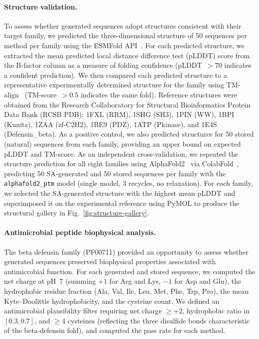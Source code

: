 \paragraph{Structure validation.}
To assess whether generated sequences adopt structures consistent with their target family, we predicted the three-dimensional structure of 50 sequences per method per family using the ESMFold API~\cite{linEvolutionaryScaleModeling2023}. For each predicted structure, we extracted the mean predicted local distance difference test (pLDDT) score from the B-factor column as a measure of folding confidence (pLDDT~$> 70$ indicates a confident prediction). We then compared each predicted structure to a representative experimentally determined structure for the family using TM-align~\cite{zhangTMalign2005} (TM-score~$> 0.5$ indicates the same fold). Reference structures were obtained from the Research Collaboratory for Structural Bioinformatics Protein Data Bank (RCSB PDB): 1FXL (RRM), 1SHG (SH3), 1PIN (WW), 1BPI (Kunitz), 1ZAA (zf-C2H2), 1BE9 (PDZ), 1ATP (Pkinase), and 1E4S (Defensin\_beta). As a positive control, we also predicted structures for 50 stored (natural) sequences from each family, providing an upper bound on expected pLDDT and TM-score. As an independent cross-validation, we repeated the structure prediction for all eight families using AlphaFold2~\cite{jumperHighlyAccurateProtein2021} via ColabFold~\cite{mirdita2022colabfold}, predicting 50 SA-generated and 50 stored sequences per family with the \texttt{alphafold2\_ptm} model (single model, 3 recycles, no relaxation). For each family, we selected the SA-generated structure with the highest mean pLDDT and superimposed it on the experimental reference using PyMOL to produce the structural gallery in Fig.~\ref{fig:structure-gallery}.

\paragraph{Antimicrobial peptide biophysical analysis.}
The beta defensin family (PF00711) provided an opportunity to assess whether generated sequences preserved biophysical properties associated with antimicrobial function. For each generated and stored sequence, we computed the net charge at pH~7 (summing $+1$ for Arg and Lys, $-1$ for Asp and Glu), the hydrophobic residue fraction (Ala, Val, Ile, Leu, Met, Phe, Trp, Pro), the mean Kyte--Doolittle hydrophobicity, and the cysteine count. We defined an antimicrobial plausibility filter requiring net charge $\geq +2$, hydrophobic ratio in $[0.3, 0.7]$, and $\geq 4$ cysteines (reflecting the three disulfide bonds characteristic of the beta-defensin fold), and computed the pass rate for each method.

